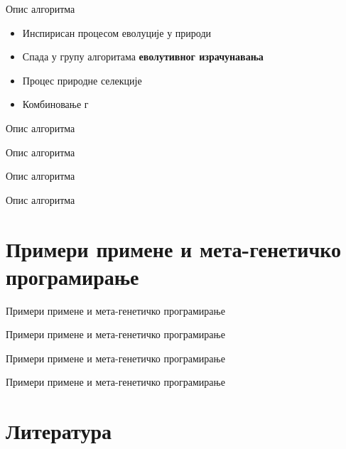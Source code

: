 \documentclass{beamer}
\begin{document}
	\begin{frame}{Опис алгоритма}
		\begin{itemize}
			\item Инспирисан процесом еволуције у природи
     		\item Спада у групу алгоритама \textbf{еволутивног израчунавања}	
     		\item Процес природне селекције
     		\item Комбиновање г
		\end{itemize}
	\end{frame}

	\begin{frame}{Опис алгоритма}
	\end{frame}

	\begin{frame}{Опис алгоритма}
	\end{frame}

	\begin{frame}{Опис алгоритма}
	\end{frame}
	
	\begin{frame}{Опис алгоритма}
	\end{frame}
	
\section{Примери примене и мета-генетичко програмирање}

	\begin{frame}{Примери примене и мета-генетичко програмирање}
	\end{frame}

	\begin{frame}{Примери примене и мета-генетичко програмирање}
	\end{frame}
	
	\begin{frame}{Примери примене и мета-генетичко програмирање}
	\end{frame}
	
	\begin{frame}{Примери примене и мета-генетичко програмирање}
	\end{frame}
	
\section{Литература}
\end{document}
